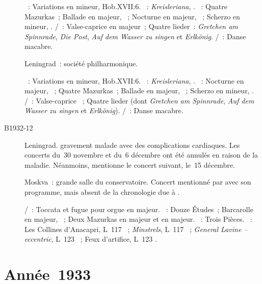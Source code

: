 \begin{description}
 \textsc{\Haydn{}}~: Variations en \kF mineur, Hob.XVII:6.
 \textsc{\Schumann{}}~: \emph{Kreisleriana}, .
 \textsc{\Chopin{}}~: Quatre Mazurkas~; Ballade en \kA \Flat majeur,
 ~; Nocturne en \kF majeur,  ~; Scherzo en \kC
 \Sharp mineur, .
 \textsc{\Schubert{}/\Liszt{}}~: Valse-caprice en \kA majeur~; Quatre
 lieder~: \emph{Gretchen am Spinnrade}, \emph{Die Post}, \emph{Auf dem
 Wasser zu singen} et \emph{Erlkönig}.
 \textsc{\SaintSaens{}/\Liszt{}}~: Danse macabre.
 \item[\DateWithWeekDay{1932-11-24}]
 Leningrad~: société philharmonique.

 \textsc{\Haydn{}}~: Variations en \kF mineur, Hob.XVII:6.
 \textsc{\Schumann{}}~: \emph{Kreisleriana}, .
 \textsc{\Chopin{}}~: Nocturne en \kF majeur,  ~; Quatre
 Mazurkas~; Ballade en \kA \Flat majeur, ~; Scherzo en \kC \Sharp
 mineur, .
 \textsc{\Schubert{}/\Liszt{}}~: Valse-caprice ~; Quatre lieder
 (dont \emph{Gretchen am Spinnrade}, \emph{Auf dem Wasser zu singen} et
 \emph{Erlkönig}).
 \textsc{\SaintSaens{}/\Liszt{}}~: Danse macabre.
 \item[B1932-12]
 Leningrad.
 \VSofronitsky{} gravement malade avec des complications cardiaques.
 Les concerts du~30 novembre et du~6 décembre ont été annulés en raison de
 la maladie.
 Néanmoins, \citet[p.~155]{Nekrasova08} mentionne le concert suivant, le~15
 décembre.
 \item[\DateWithWeekDay{1932-12-15}]
 Moskva~: grande salle du conservatoire.
 Concert mentionné par \citet[p.~155]{Nekrasova08} avec son programme, mais
 absent de la chronologie due à \citet[p.~405]{Scriabine}.

 \textsc{\JBach{}/\Busoni{}}~: Toccata et fugue pour orgue en \kC majeur.
 \textsc{\Chopin{}}~: Douze Études~; Barcarolle en \kF \Sharp majeur,
 ~; Deux Mazurkas en \kD majeur et en \kB majeur.
 \textsc{\Prokofiev{}}~: Trois Pièces.
 \textsc{\Debussy{}}~: Les Collines d'\hbox{Anacapri}, L~117 ~;
 \emph{Minstrels}, L~117 ~; \emph{General Lavine -- eccentric},
 L~123 ~; Feux d'artifice, L~123 .
\end{description}

\section{Année~1933}

